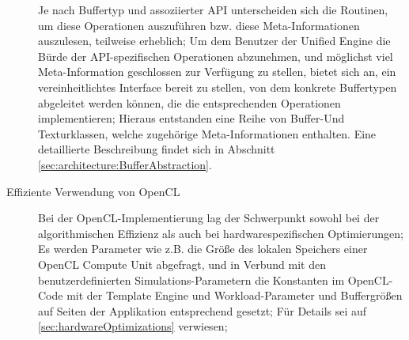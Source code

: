 \begin{description}
	Je nach Buffertyp und assoziierter API unterscheiden sich die Routinen, um diese Operationen auszuführen bzw. diese 	
	Meta-Informationen auszulesen, 
	teilweise erheblich;
	Um dem Benutzer der Unified Engine die Bürde der API-spezifischen Operationen abzunehmen, und möglichst viel
	Meta-Information geschlossen zur Verfügung zu stellen, bietet sich an,
	ein vereinheitlichtes Interface bereit zu stellen, von dem konkrete Buffertypen abgeleitet werden können,
	die die entsprechenden Operationen implementieren;
	Hieraus entstanden eine Reihe von Buffer-Und Texturklassen, welche zugehörige Meta-Informationen \linebreak enthalten.
	Eine detaillierte Beschreibung findet sich in Abschnitt \ref{sec:architecture:BufferAbstraction}.
	
	
	
	\item[Effiziente Verwendung von OpenCL]
		Bei der OpenCL-Implementierung lag der Schwerpunkt sowohl bei der algorithmischen Effizienz
		als auch bei hardwarespezifischen Optimierungen; Es werden Parameter wie z.B. die Größe
		des lokalen Speichers einer OpenCL Compute Unit abgefragt, und in Verbund mit den benutzerdefinierten
		Simulations-Parametern die Konstanten im OpenCL-Code mit der 
		Template Engine und Workload-Parameter und Buffergrößen auf Seiten der Applikation entsprechend gesetzt;
		Für Details sei auf \ref{sec:hardwareOptimizations} verwiesen;



\end{description}
	
	
\clearpage

